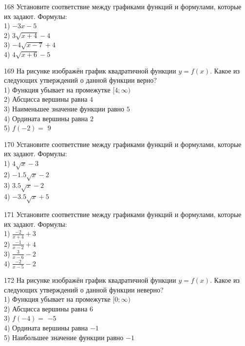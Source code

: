 \documentclass[4apaper]{article}
\begin{document}
\begin{taskBN}{168}
Установите соответствие между графиками функций и формулами, которые их задают. Формулы: \\1) $-3x-5$\\2) $3\sqrt{x+4}-4$\\3) $-4\sqrt{x-7}+4$\\4) $4\sqrt{x+6}-5$
\end{taskBN}

\begin{taskBN}{169}
На рисунке изображён график квадратичной функции $y=f(x)$. Какое из следующих утверждений о данной функции верно?\\1) Функция убывает на промежутке $[4; \infty)$\\2) Абсцисса вершины равна $4$\\3) Наименьшее значение функции равно  $5$\\4) Ордината вершины равна $2$\\5) $f(-2)=$ $9$
\end{taskBN}

\begin{taskBN}{170}
Установите соответствие между графиками функций и формулами, которые их задают. Формулы: \\1) $4\sqrt{x}-3$\\2) $-1.5\sqrt{x}-2$\\3) $3.5\sqrt{x}-2$\\4) $-3.5\sqrt{x}+5$
\end{taskBN}

\begin{taskBN}{171}
Установите соответствие между графиками функций и формулами, которые их задают. Формулы: \\1) $\frac{-2}{x+4}+3$\\2) $\frac{-1}{x-2}+4$\\3) $\frac{3}{x-6}-2$\\4) $\frac{-2}{x-5}-2$
\end{taskBN}

\begin{taskBN}{172}
На рисунке изображён график квадратичной функции $y=f(x)$. Какое из следующих утверждений о данной функции неверно?\\1) Функция убывает на промежутке $[0; \infty)$\\2) Абсцисса вершины равна $6$\\3) $f(-4)=$ $-5$\\4) Ордината вершины равна $-1$\\5) Наибольшее значение функции равно  $-1$
\end{taskBN}
\end{document}
